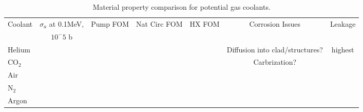 \documentclass[]{report}
\begin{document}
\begin{table} \label{tab:coolants}
\hspace*{-2cm} %
\begin{tabular}{|l|c|c|c|c|c|c|}
%
%
%
\centering
Coolant &  $\sigma_a$ at 0.1MeV,  & Pump FOM & Nat Circ FOM & HX FOM & Corrosion Issues & Leakage\\
 & $10^-5$ b & & & & &\\
\hline
Helium &  & & & & Diffusion into clad/structures? & highest\\
\hline
CO$_2$ & & & & & Carbrization? &\\
\hline
Air & \\
\hline
N$_2$ &\\
\hline
Argon & &\\
\hline
\end{tabular}
\caption{Material property comparison for potential gas coolants.}
\end{table}
\end{document}
